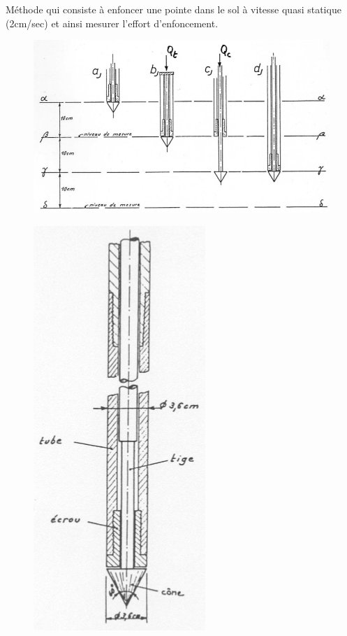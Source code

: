             Méthode qui consiste à enfoncer une pointe dans le sol à vitesse quasi statique (2cm/sec) et ainsi mesurer l'effort d'enfoncement. 
            
            \begin{multicols}{3}
            
                \begin{figure}[h!]
                \includegraphics[scale=0.65]{Holeyman/images/H15.PNG}
                \end{figure}
            
            \vfill\null\columnbreak
            \vfill\null\columnbreak
            
                \begin{figure}[h!]
                \includegraphics[scale=0.6]{Holeyman/images/H16.PNG}
                \end{figure}
                
            \end{multicols}
            

